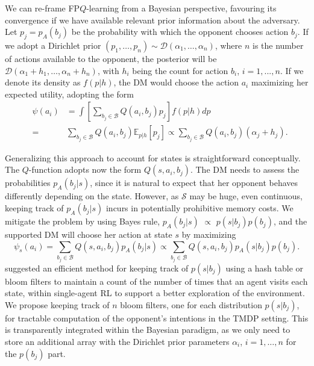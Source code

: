 We can re-frame FP$Q$-learning from a Bayesian perspective,
favouring its convergence if we have available relevant  
prior information about the adversary. %
Let $p_j = p_A(b_j)$ be the probability with which
the opponent chooses action $b_j$. 
If we adopt a Dirichlet prior
$(p_1 , \ldots, p_n) \sim \mathcal{D}(\alpha_1,\ldots,\alpha_n)$,
where $n$ is the number of actions available to the opponent, 
the posterior will be  
$\mathcal{D}(\alpha_1 + h_1,\ldots,\alpha_n + h_n)$, with  $h_i$ 
being the count for action $b_i$, $i=1,...,n$. 
If we denote its density as $f(p|h)$, the DM would choose the action $a_i$ maximizing her expected utility,
adopting the form
\begin{eqnarray*}
& \psi(a_i) & = \int \left[\sum_{b_j \in \mathcal{B}}
Q(a_i, b_j) p_j\right] f(p|h) dp \\
&=& \sum_{b_j \in \mathcal{B}} Q(a_i, b_j) \mathbb{E}_{p|h}[p_j]
\propto  \sum_{b_j \in \mathcal{B}} Q(a_i, b_j) (\alpha_j + h_j).
\end{eqnarray*}

Generalizing this approach to account for states is straightforward
conceptually.
The $Q$-function adopts now the form $Q(s, a_i, b_j)$. The DM needs to assess the probabilities $p_A(b_j | s)$,
since it is natural to expect that her opponent behaves differently depending
on the state.
However, as $\mathcal{S}$ may be huge, even continuous, keeping track of $p_A(b_j|s)$ 
incurs in potentially prohibitive memory costs. 
We mitigate the 
problem by using 
Bayes rule, $p_{A}(b_j| s) \,\, \propto \,\, p(s| b_j)p(b_j)$, 
and the supported DM will choose her action at state $s$ by maximizing
\[ \psi_s(a_i) = \sum_{b_j \in \mathcal{B}} Q(s, a_i, b_j) p_{A}(b_j|s)
\propto 
\sum_{b_j \in \mathcal{B}} Q(s, a_i, b_j) p_{A}(s | b_j) p (b_j ).  \]
  \parencite{tang2017exploration} suggested an efficient method for keeping track of $p(s| b_j)$ using a hash table or bloom filters to maintain a count of the number of times that an agent visits each state, within single-agent RL to support a better exploration of the environment. We propose keeping 
  track of $n$ bloom filters, one for each
distribution $p(s|b_j)$, for tractable computation of the opponent's intentions
in the TMDP setting. This is transparently integrated
within the Bayesian paradigm, as we only need to store an additional array with the Dirichlet prior parameters $\alpha_i$, $i=1,\ldots, n$ for the $p(b_j)$ part. %


